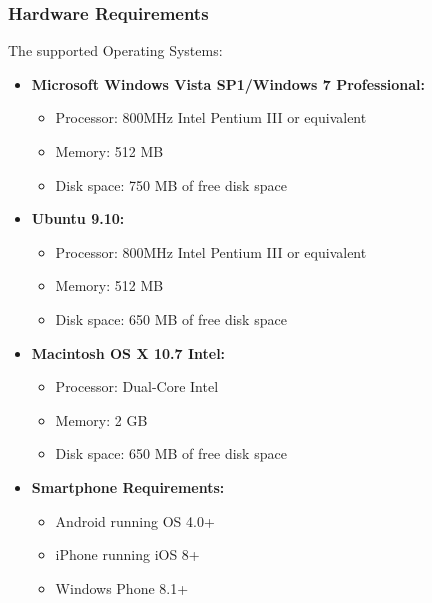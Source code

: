 \documentclass[11 pt]{article}
\begin{document}
    \subsubsection{Hardware Requirements}
The supported Operating Systems:
\begin{itemize}

\item
        \textbf{Microsoft Windows Vista SP1/Windows 7 Professional:}
        \begin{itemize}
        
            \item
            Processor: 800MHz Intel Pentium III or equivalent
            \item
            Memory: 512 MB
            \item
            Disk space: 750 MB of free disk space
            \end{itemize}
\item
        \textbf{Ubuntu 9.10:}
        \begin{itemize}
        \item
            Processor: 800MHz Intel Pentium III or equivalent
            \item
            Memory: 512 MB
            \item
            Disk space: 650 MB of free disk space
            \end{itemize}
        \item
        \textbf{Macintosh OS X 10.7 Intel:}
        \begin{itemize}
        
            \item
            Processor: Dual-Core Intel
            \item
            Memory: 2 GB
            \item
            Disk space: 650 MB of free disk space
            \end{itemize}
            \item
            \textbf{Smartphone Requirements:}
\begin{itemize}

\item
    Android running OS 4.0+
    \item
    iPhone running iOS 8+
    \item
    Windows Phone 8.1+
\end{itemize}
\end{itemize}
    
\end{document}
